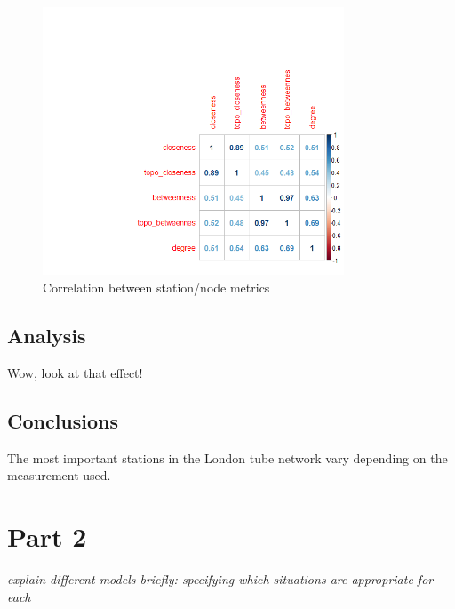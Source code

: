 \documentclass[11pt]{article} %
\begin{document}
\begin{figure}
\centering
\includegraphics[width=0.8\textwidth]{Corr_tube_graph_node_stats}
\caption{Correlation between station/node metrics}
\end{figure}




\subsection{Analysis}

Wow, look at that effect!


\subsection{Conclusions}

The most important stations in the London tube network vary depending on the measurement used. 



\section{Part 2}

\textit{explain different models briefly: specifying which situations are appropriate for each}
\end{document}
